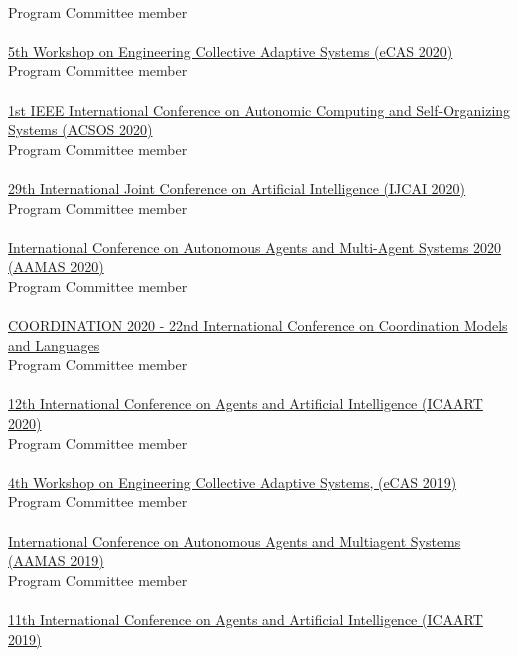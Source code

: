 \\ Program Committee member \\
\halfblankline \\
\href{http://archive.vn/wip/38Ah6}{5th Workshop on Engineering Collective Adaptive Systems (eCAS 2020)}
\\ Program Committee member \\
\halfblankline \\
\href{https://conf.researchr.org/home/acsos-2020}{1st IEEE International Conference on Autonomic Computing and Self-Organizing Systems (ACSOS 2020)}
\\ Program Committee member \\
\halfblankline \\
\href{https://https://ijcai20.org/}{29th International Joint Conference on Artificial Intelligence (IJCAI 2020)}
\\ Program Committee member \\
\halfblankline \\
\href{https://aamas2020.conference.auckland.ac.nz/program-committee-members/}{International Conference on Autonomous Agents and Multi-Agent Systems 2020 (AAMAS 2020)}
\\ Program Committee member \\
\halfblankline \\
\href{http://www.discotec.org/2020/coordination}{COORDINATION 2020 - 22nd International Conference on Coordination Models and Languages}
\\ Program Committee member \\
\halfblankline \\
\href{http://www.icaart.org/?y=2020}{12th International Conference on Agents and Artificial Intelligence
(ICAART 2020)}
\\ Program Committee member \\
\halfblankline \\
\href{http://apice.unibo.it/xwiki/bin/view/ECAS2019/Committees}{4th Workshop on Engineering Collective Adaptive Systems, (eCAS 2019)}
\\ Program Committee member \\
\halfblankline \\
\href{http://aamas2019.encs.concordia.ca/}{International Conference on Autonomous Agents and
Multiagent Systems (AAMAS 2019)}
\\ Program Committee member \\
\halfblankline \\
\href{http://www.icaart.org/?y=2019}{11th International Conference on Agents and Artificial Intelligence
(ICAART 2019)}
